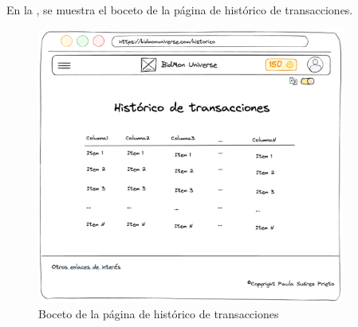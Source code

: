 En la , se muestra el boceto de la página de histórico de transacciones.
\begin{figure}[H]
    \centering
    \includegraphics[width=0.9\textwidth]{figures/6-Analisis/6-Interfaz/prototipos/historico-transacciones.png}
    \caption{Boceto de la página de histórico de transacciones}
    \label{fig:p_transactions}
    \hypertarget{fig:p_transactions}{}
\end{figure}